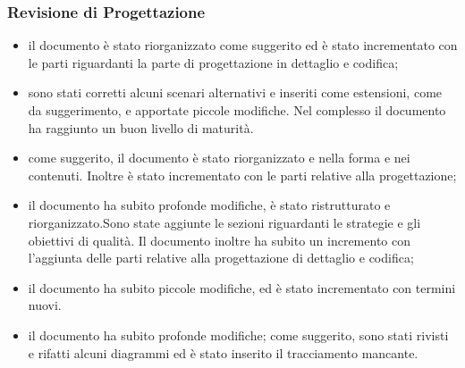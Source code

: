 \subsubsection{Revisione di Progettazione}
\begin{itemize}
\item {} il documento è stato riorganizzato come suggerito ed è stato incrementato con le parti riguardanti la parte di progettazione in dettaglio e codifica;
\item {} sono stati corretti alcuni scenari alternativi e inseriti come estensioni, come da suggerimento, e apportate piccole modifiche. Nel complesso il documento ha raggiunto un buon livello di maturità.
\item {} come suggerito, il documento è stato riorganizzato e nella forma e nei contenuti. Inoltre è stato incrementato con le parti relative alla progettazione;
\item {} il documento ha subito profonde modifiche, è stato ristrutturato e riorganizzato.Sono state aggiunte le sezioni riguardanti le strategie e gli obiettivi di qualità.
Il documento inoltre ha subito un incremento con l'aggiunta delle parti relative alla progettazione di dettaglio e codifica;
\item {} il documento ha subito piccole modifiche, ed è stato incrementato con termini nuovi.
\item {} il documento ha subito profonde modifiche; come suggerito, sono stati rivisti e rifatti alcuni diagrammi ed è stato inserito il tracciamento mancante.
\end{itemize}





